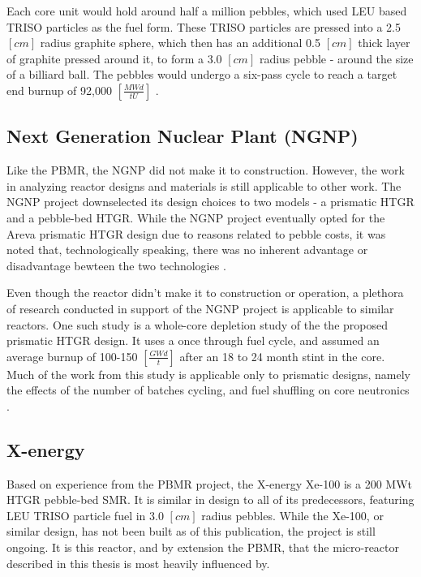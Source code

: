 

Each core unit would hold around half a million pebbles, which used LEU based TRISO particles as the fuel form.  These TRISO particles are pressed into a 2.5 $\left[cm\right]$ radius graphite sphere, which then has an additional 0.5 $\left[cm\right]$ thick layer of graphite pressed around it, to form a 3.0 $\left[cm\right]$ radius pebble - around the size of a billiard ball.  The pebbles would undergo a six-pass cycle to reach a target end burnup of 92,000 $\left[\frac{MWd}{tU}\right]$ \cite{venter_pbmr_2005}. 

\subsection{Next Generation Nuclear Plant (NGNP)}

Like the PBMR, the NGNP did not make it to construction.  However, the work in analyzing reactor designs and materials is still applicable to other work.  The NGNP project downselected its design choices to two models - a prismatic HTGR and a pebble-bed HTGR.  While the NGNP project eventually opted for the Areva prismatic HTGR design \cite{noauthor_areva_nodate} due to reasons related to pebble costs, it was noted that, technologically speaking, there was no inherent advantage or disadvantage bewteen the two technologies \cite{inl_basis_2011}.

Even though the reactor didn't make it to construction or operation, a plethora of research conducted in support of the NGNP project is applicable to similar reactors.  One such study is a whole-core depletion study of the the proposed prismatic HTGR design.  It uses a once through fuel cycle, and assumed an average burnup of 100-150 $\left[\frac{GWd}{t}\right]$ after an 18 to 24 month stint in the core.  Much of the work from this study is applicable only to prismatic designs, namely the effects of the number of batches cycling, and fuel shuffling on core neutronics \cite{tkkim_whole-core_nodate}.

\subsection{X-energy}

Based on experience from the PBMR project, the X-energy Xe-100 is a 200 MWt HTGR pebble-bed SMR.  It is similar in design to all of its predecessors, featuring LEU TRISO particle fuel in 3.0 $\left[cm\right]$ radius pebbles.  While the Xe-100, or similar design, has not been built as of this publication, the project is still ongoing.  It is this reactor, and by extension the PBMR, that the micro-reactor described in this thesis is most heavily influenced by.

